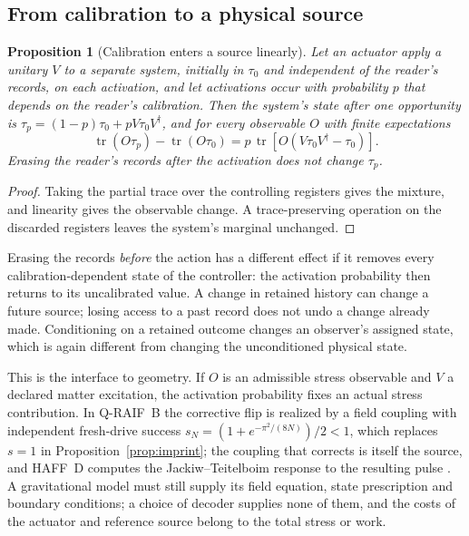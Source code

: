 \documentclass[11pt,a4paper]{article}
\newtheorem{proposition}[definition]{Proposition}
\newcommand{\tr}{\operatorname{tr}}
\begin{document}
\subsection{From calibration to a physical source}

\begin{proposition}[Calibration enters a source linearly]\label{prop:sourcelin}
Let an actuator apply a unitary $V$ to a separate system, initially in $\tau_0$ and independent of the reader's records, on each activation, and let activations occur with probability $p$ that depends on the reader's calibration. Then the system's state after one opportunity is $\tau_p=(1-p)\tau_0+pV\tau_0V^\dagger$, and for every observable $O$ with finite expectations
\[
 \tr(O\tau_p)-\tr(O\tau_0)=p\,\tr\!\left[O(V\tau_0V^\dagger-\tau_0)\right].
\]
Erasing the reader's records after the activation does not change $\tau_p$.
\end{proposition}
\begin{proof}
Taking the partial trace over the controlling registers gives the mixture, and linearity gives the observable change. A trace-preserving operation on the discarded registers leaves the system's marginal unchanged.
\end{proof}

Erasing the records \emph{before} the action has a different effect if it removes every calibration-dependent state of the controller: the activation probability then returns to its uncalibrated value. A change in retained history can change a future source; losing access to a past record does not undo a change already made. Conditioning on a retained outcome changes an observer's assigned state, which is again different from changing the unconditioned physical state.

This is the interface to geometry. If $O$ is an admissible stress observable and $V$ a declared matter excitation, the activation probability fixes an actual stress contribution. In Q-RAIF~B the corrective flip is realized by a field coupling with independent fresh-drive success $s_N=(1+e^{-\pi^2/(8N)})/2<1$, which replaces $s=1$ in Proposition~\ref{prop:imprint}; the coupling that corrects is itself the source, and HAFF~D computes the Jackiw--Teitelboim response to the resulting pulse \cite{QRAIFB,HAFFD}. A gravitational model must still supply its field equation, state prescription and boundary conditions; a choice of decoder supplies none of them, and the costs of the actuator and reference source belong to the total stress or work.
\end{document}
